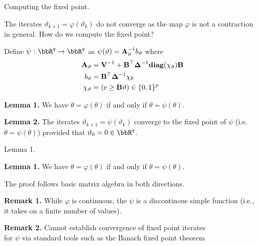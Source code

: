 \documentclass[11pt,leqno]{beamer}
\begin{document}
\begin{frame}{Computing the fixed point.}

The iterates $\vartheta_{k+1} = \varphi (\vartheta_k )$
do not converge as the map $\varphi$ is not a
contraction in general. How do we compute
the fixed point?

Define $\psi \cst \bbR^q \to \bbR^q$ as 
$\psi (\vartheta) = \mathbf{A}^{-1}_\vartheta b_\vartheta$ where
\begin{equation}
\begin{aligned}
  \mathbf{A}_\vartheta &= \mathbf{V}^{-1} + \mathbf{B}^\top \bm{\Delta}^{-1}
  \textbf{diag}(\chi_\vartheta) \mathbf{B} \\
  b_\vartheta &= \mathbf{B}^\top \bm{\Delta}^{-1} \chi_\theta \\
  \chi_\vartheta &= (\mathrm{e} \ge \mathbf{B} \vartheta)   
  \in \{0,1\}^p
\end{aligned}
\end{equation}

{\bf Lemma 1.} We have $\theta = \varphi(\theta)$ if and 
only if $\theta = \psi(\theta)$.

{\bf Lemma 2.} The iterates $\vartheta_{k+1}
= \psi(\vartheta_k)$ converge to the fixed point 
of $\psi$ (i.e. $\theta = \psi(\theta)$)
provided that $\vartheta_0 = 0 \in \bbR^q$.


\end{frame}


\begin{frame}{Lemma 1.}


{\bf Lemma 1.} We have $\theta = \varphi(\theta)$ if and 
only if $\theta = \psi(\theta)$.

The proof follows basic matrix algebra in both directions.

{\bf Remark 1.} 
While $\varphi$ is continuous, the $\psi$
is a discontinous simple function (i.e., 
it takes on a finite number of values).

{\bf Remark 2.} 
Cannot establish convergence of fixed point iterates
\\for $\psi$ via standard tools such as the Banach
fixed point theorem 

\end{frame}
\end{document}
